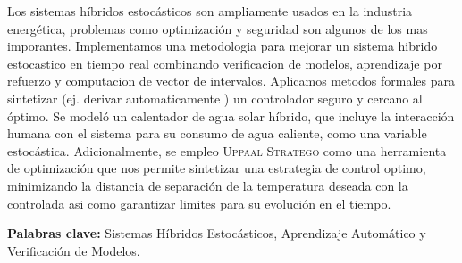 \begin{resumen}


Los sistemas híbridos estocásticos son ampliamente usados en la industria
energética, problemas como optimización y seguridad son algunos de los 
mas imporantes. Implementamos una metodologia para mejorar un sistema hibrido
estocastico en tiempo real combinando verificacion de modelos, aprendizaje
por refuerzo y computacion de vector de intervalos. Aplicamos metodos formales
para sintetizar (ej. derivar automaticamente ) un controlador seguro y cercano 
al óptimo. Se modeló un calentador de agua solar híbrido, que incluye 
la interacción humana con el sistema para su consumo de agua caliente, 
como una variable estocástica. Adicionalmente, se empleo \textsc{Uppaal
 Stratego} como una herramienta de optimización que nos permite sintetizar 
 una estrategia de control optimo, minimizando la distancia de separación 
 de la temperatura deseada con la controlada
asi como garantizar limites para su evolución en el tiempo.

\begin{flushleft}
\textbf{Palabras clave:} Sistemas Híbridos Estocásticos, Aprendizaje Automático y Verificación de Modelos.
\end{flushleft}

\end{resumen}
